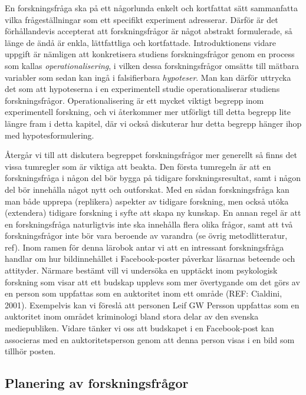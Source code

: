 \documentclass[
]{book}
\begin{document}
En forskningsfråga ska på ett någorlunda enkelt och kortfattat sätt sammanfatta vilka frågeställningar som ett specifikt experiment adresserar. Därför är det förhållandevis accepterat att forskningsfrågor är något abstrakt formulerade, så länge de ändå är enkla, lättfattliga och kortfattade. Introduktionens vidare uppgift är nämligen att konkretisera studiens forskningsfrågor genom en process som kallas \emph{operationalisering}, i vilken dessa forskningsfrågor omsätts till mätbara variabler som sedan kan ingå i falsifierbara \emph{hypoteser}. Man kan därför uttrycka det som att hypoteserna i en experimentell studie operationaliserar studiens forskningsfrågor. Operationalisering är ett mycket viktigt begrepp inom experimentell forskning, och vi återkommer mer utförligt till detta begrepp lite längre fram i detta kapitel, där vi också diskuterar hur detta begrepp hänger ihop med hypotesformulering.

Återgår vi till att diskutera begreppet forskningsfrågor mer generellt så finns det vissa tumregler som är viktiga att beakta. Den första tumregeln är att en forskningsfråga i någon del bör bygga på tidigare forskningsresultat, samt i någon del bör innehålla något nytt och outforskat. Med en sådan forskningsfråga kan man både upprepa (replikera) aspekter av tidigare forskning, men också utöka (extendera) tidigare forskning i syfte att skapa ny kunskap. En annan regel är att en forskningsfråga naturligtvis inte ska innehålla flera olika frågor, samt att två forskningsfrågor inte bör vara beroende av varandra (se övrig metodlitteratur, ref). Inom ramen för denna lärobok antar vi att en intressant forskningsfråga handlar om hur bildinnehållet i Facebook-poster påverkar läsarnas beteende och attityder. Närmare bestämt vill vi undersöka en upptäckt inom psykologisk forskning som visar att ett budskap upplevs som mer övertygande om det görs av en person som uppfattas som en auktoritet inom ett område (REF: Cialdini, 2001). Exempelvis kan vi föreslå att personen Leif GW Persson uppfattas som en auktoritet inom området kriminologi bland stora delar av den svenska mediepubliken. Vidare tänker vi oss att budskapet i en Facebook-post kan associeras med en auktoritetsperson genom att denna person visas i en bild som tillhör posten.

\hypertarget{sub06.1.1}{%
\subsection{Planering av forskningsfrågor}\label{sub06.1.1}}
\end{document}
